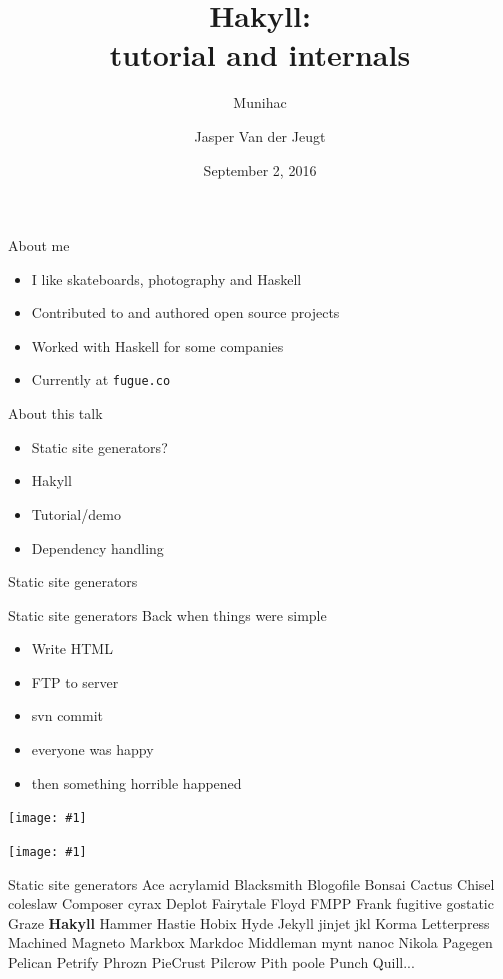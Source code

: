\documentclass[20pt]{beamer}
\newcommand{\vspaced}{
    \vspace{5mm}
}
\newcommand{\imageframe}[1]{
    {
        \begin{frame}[plain]
        \begin{center}
        \texttt{[image: \#1]}
        \end{center}
        \end{frame}
    }
}
\newcommand{\chapterslide}[1]{
    {
        \begin{frame}[plain]
        \begin{center}
        \large{#1}
        \end{center}
        \end{frame}
    }
}
\newcommand{\code}[1]{
    \texttt{\small{#1}}
}
\begin{document}
\title{Hakyll: \\
tutorial and internals}
\subtitle{Munihac}
\author{Jasper Van der Jeugt}
\date{September 2, 2016}

\begin{frame}[plain]
    \titlepage
\end{frame}

\begin{frame}{About me}
    \begin{itemize}
    \item I like skateboards, photography and Haskell
    \item Contributed to and authored open source projects
    \item Worked with Haskell for some companies
    \item Currently at \code{fugue.co}
    \end{itemize}
\end{frame}

\begin{frame}{About this talk}
    \begin{itemize}
    \item Static site generators?
    \item Hakyll
    \item Tutorial/demo
    \item Dependency handling
    \end{itemize}
\end{frame}

\chapterslide{Static site generators}

\begin{frame}{Static site generators}
    Back when things were simple \\
    \vspaced
    \begin{itemize}
    \item Write HTML
    \item FTP to server
    \item svn commit
    \item everyone was happy
    \item then something horrible happened
    \end{itemize}
\end{frame}

\imageframe{images/php.jpg}

\imageframe{images/cms.png}

\begin{frame}{Static site generators}
    \small{
    Ace acrylamid Blacksmith Blogofile Bonsai Cactus Chisel coleslaw
    Composer cyrax Deplot Fairytale Floyd FMPP Frank fugitive gostatic Graze
    \textbf{Hakyll} Hammer Hastie Hobix Hyde Jekyll jinjet jkl Korma Letterpress
    Machined Magneto Markbox Markdoc Middleman mynt nanoc Nikola Pagegen
    Pelican Petrify Phrozn PieCrust Pilcrow Pith poole Punch Quill...
    }
\end{frame}
\end{document}
